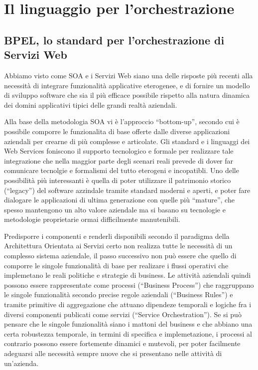 \chapter{Il linguaggio per l'orchestrazione}

\section{BPEL, lo standard per l'orchestrazione di Servizi Web}
Abbiamo visto come SOA e i Servizi Web siano una delle risposte più recenti
alla necessità di integrare funzionalità applicative eterogenee, e di fornire
un modello di sviluppo software che sia il pi\`u efficace possibile rispetto
alla natura dinamica dei domini applicativi tipici delle grandi realtà
aziendali.

Alla base della metodologia SOA vi è l'approccio ``bottom-up'', secondo cui è
possibile comporre le funzionalita di base offerte dalle diverse applicazioni
aziendali per crearne di più complesse e articolate. Gli standard e i linguaggi
dei Web Services foniscono il supporto tecnologico e formale per realizzare tale
integrazione che nella maggior parte degli scenari reali prevede di dover far
comunicare tecnolgie e formalismi del tutto eterogeni e incopatibli. Uno delle
possibilità più interessanti è quella di poter utilizzare il patrimonio storico
(``legacy'') del software azzindale tramite standard moderni e aperti, e poter
fare dialogare le applicazioni di ultima generazione con quelle più ``mature'',
che spesso mantengono un alto valore aziendale ma si basano su tecnologie e
metodologie proprietarie ormai difficilmente manutenibili.

Predisporre i componenti e renderli disponibili secondo il paradigma della
Architettura Orientata ai Servizi certo non realizza tutte le necessità di un
complesso sistema aziendale, il passo successivo non può essere che quello di
comporre le singole funzionalità di base per realizare i flussi operativi che
implemetano le reali politiche e strategie di business. Le attività aziendali
quindi possono essere rappresentate come processi (``Business Process'') che
raggruppano le singole funzionalità secondo precise regole aziendali (``Business
Rules'') e tramite primitive di aggregazione che attuano dipendeze temporali e
logiche fra i diversi componenti publicati come servizi (``Service
Orchestration''). Se si può pensare che le singole funzionalità siano i mattoni
del business e che abbiano una certa robustezza temporale, in termini di
specifica e implemetazione, i processi al contrario possono essere fortemente
dinamici e mutevoli, per poter facilmente adeguarsi alle necessità sempre nuove
che si presentano nelle attività di un'azienda.

